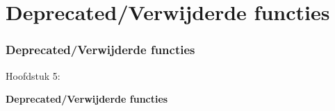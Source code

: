 %

\section{Deprecated/Verwijderde functies}
\begin{frame}[fragile]
	\frametitle{Deprecated/Verwijderde functies}

	\begin{center}\huge{Hoofdstuk 5:}\end{center}
	\begin{center}\huge{\color{typo3darkgrey}\textbf{Deprecated/Verwijderde functies}}\end{center}

\end{frame}


